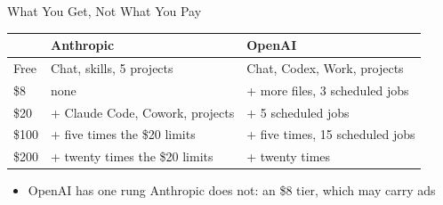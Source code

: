 \documentclass[aspectratio=169]{beamer}
\begin{document}
\begin{frame}{What You Get, Not What You Pay}
    \begin{center}
    \small
    \begin{tabular}{p{1.5cm}>{\raggedright\arraybackslash}p{5.4cm}>{\raggedright\arraybackslash}p{5.0cm}}
        \toprule
        & Anthropic & OpenAI \\
        \midrule
        Free    & Chat, skills, 5 projects              & Chat, Codex, Work, projects \\
        \$8     & none                                  & + more files, 3 scheduled jobs \\
        \$20    & + Claude Code, Cowork, projects  & + 5 scheduled jobs \\
        \$100   & + five times the \$20 limits          & + five times, 15 scheduled jobs \\
        \$200   & + twenty times the \$20 limits        & + twenty times \\
        \bottomrule
    \end{tabular}
    \end{center}

    \vspace{0.8em}
    \begin{itemize}
        \item OpenAI has one rung Anthropic does not: an \$8 tier, which may carry ads
    \end{itemize}
\end{frame}
\end{document}
